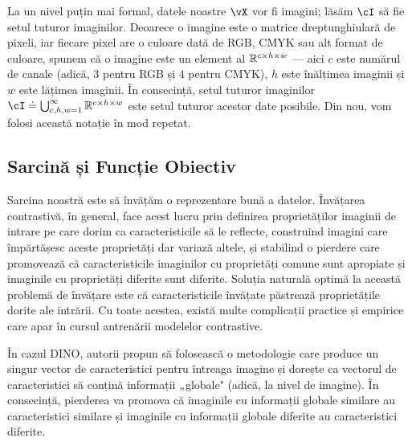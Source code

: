 \documentclass[../../book-main_ro.tex]{subfiles}
\begin{document}
La un nivel puțin mai formal, datele noastre \(\vX\) vor fi imagini; lăsăm \(\cI\) să fie setul tuturor imaginilor. Deoarece o imagine este o matrice dreptunghiulară de pixeli, iar fiecare pixel are o culoare dată de RGB, CMYK sau alt format de culoare, spunem că o imagine este un element al \(\mathbb{R}^{c \times h \times w}\) --- aici \(c\) este numărul de canale (adică, \(3\) pentru RGB și \(4\) pentru CMYK), \(h\) este înălțimea imaginii și \(w\) este lățimea imaginii. În consecință, setul tuturor imaginilor \(\cI \doteq \bigcup_{c, h, w = 1}^{\infty}\R^{c \times h \times w}\) este setul tuturor acestor date posibile. Din nou, vom folosi această notație în mod repetat.


\subsection{Sarcină și Funcție Obiectiv} \label{sub:contrastive_learning_objective}

Sarcina noastră este să învățăm o reprezentare bună a datelor. Învățarea contrastivă, în general, face acest lucru prin definirea proprietăților imaginii de intrare pe care dorim ca caracteristicile să le reflecte, construind imagini care împărtășesc aceste proprietăți dar variază altele, și stabilind o pierdere care promovează că caracteristicile imaginilor cu proprietăți comune sunt apropiate și imaginile cu proprietăți diferite sunt diferite. Soluția naturală optimă la această problemă de învățare este că caracteristicile învățate păstrează proprietățile dorite ale intrării. Cu toate acestea, există multe complicații practice și empirice care apar în cursul antrenării modelelor contrastive.

În cazul DINO, autorii propun să folosească o metodologie care produce un singur vector de caracteristici pentru întreaga imagine și dorește ca vectorul de caracteristici să conțină informații „globale" (adică, la nivel de imagine). În consecință, pierderea va promova că imaginile cu informații globale similare au caracteristici similare și imaginile cu informații globale diferite au caracteristici diferite.
\end{document}
